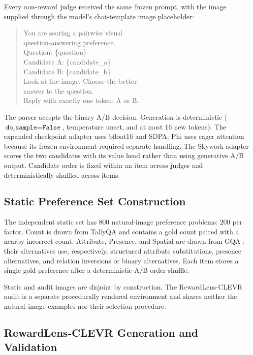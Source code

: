 Every non-reward judge received the same frozen prompt, with the image supplied
through the model's chat-template image placeholder:
\begin{quote}\small\ttfamily
You are scoring a pairwise visual\\
question-answering preference.\\
Question: \{question\}\\
Candidate A: \{candidate\_a\}\\
Candidate B: \{candidate\_b\}\\[2pt]
Look at the image. Choose the better\\
answer to the question.\\
Reply with exactly one token: A or B.
\end{quote}
The parser accepts the binary A/B decision. Generation is deterministic
($\texttt{do\_sample}=\texttt{False}$, temperature unset, and at most 16 new
tokens). The expanded checkpoint adapter uses bfloat16 and SDPA; Phi uses eager
attention because its frozen environment required separate handling. The
Skywork adapter scores the two candidates with its value head rather than using
generative A/B output. Candidate order is fixed within an item across judges
and deterministically shuffled across items.

\subsection{Static Preference Set Construction}
\label{app:static-construction}

The independent static set has 800 natural-image preference problems: 200
per factor. Count is drawn from TallyQA \citep{acharya2019tallyqa} and contains
a gold count paired with a nearby incorrect count. Attribute, Presence, and
Spatial are drawn from GQA \citep{hudson2019gqa};
their alternatives use, respectively, structured attribute substitutions,
presence alternatives, and relation inversions or binary alternatives. Each
item stores a single gold preference after a deterministic A/B order shuffle.

Static and audit images are disjoint by construction. The RewardLens-CLEVR
audit is a separate procedurally rendered environment and shares neither the
natural-image examples nor their selection procedure.

\subsection{RewardLens-CLEVR Generation and Validation}
\label{app:clevr-generation-validation}

